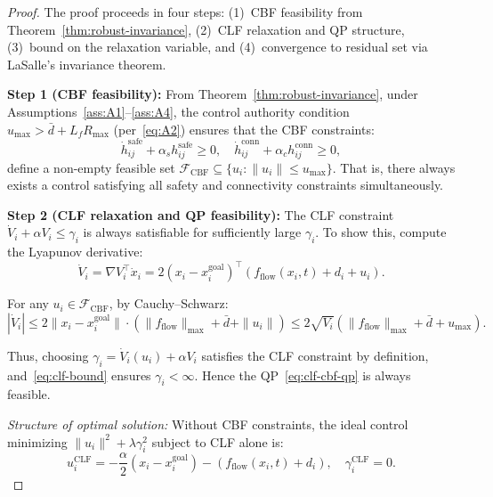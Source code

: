 \documentclass[conference]{IEEEconf}
\theoremstyle{plain}
\begin{document}
\begin{proof}
The proof proceeds in four steps: (1)~CBF feasibility from Theorem~\ref{thm:robust-invariance}, (2)~CLF relaxation and QP structure, (3)~bound on the relaxation variable, and (4)~convergence to residual set via LaSalle's invariance theorem.

\medskip
\noindent\textbf{Step 1 (CBF feasibility):}
From Theorem~\ref{thm:robust-invariance}, under Assumptions~\ref{ass:A1}--\ref{ass:A4}, the control authority condition $u_{\max}>\bar{d}+L_fR_{\max}$ (per~\eqref{eq:A2}) ensures that the CBF constraints:
\begin{equation}
\dot{h}_{ij}^{\mathrm{safe}} + \alpha_s h_{ij}^{\mathrm{safe}} \ge 0, \quad \dot{h}_{ij}^{\mathrm{conn}} + \alpha_c h_{ij}^{\mathrm{conn}} \ge 0,
\label{eq:cbf-constraints-t2}
\end{equation}
define a non-empty feasible set $\mathcal{F}_{\mathrm{CBF}}\subseteq\{u_i:\|u_i\|\le u_{\max}\}$. That is, there always exists a control satisfying all safety and connectivity constraints simultaneously.

\medskip
\noindent\textbf{Step 2 (CLF relaxation and QP feasibility):}
The CLF constraint $\dot{V}_i+\alpha V_i\le\gamma_i$ is always satisfiable for sufficiently large $\gamma_i$. To show this, compute the Lyapunov derivative:
\begin{equation}
\dot{V}_i = \nabla V_i^\top\dot{x}_i = 2(x_i-x_i^{\mathrm{goal}})^\top(f_{\mathrm{flow}}(x_i,t)+d_i+u_i).
\label{eq:clf-derivative}
\end{equation}

For any $u_i\in\mathcal{F}_{\mathrm{CBF}}$, by Cauchy--Schwarz:
\begin{equation}
|\dot{V}_i| \le 2\|x_i-x_i^{\mathrm{goal}}\|\cdot(\|f_{\mathrm{flow}}\|_{\max}+\bar{d}+\|u_i\|) \le 2\sqrt{V_i}(\|f_{\mathrm{flow}}\|_{\max}+\bar{d}+u_{\max}).
\label{eq:clf-bound}
\end{equation}

Thus, choosing $\gamma_i=\dot{V}_i(u_i)+\alpha V_i$ satisfies the CLF constraint by definition, and~\eqref{eq:clf-bound} ensures $\gamma_i<\infty$. Hence the QP~\eqref{eq:clf-cbf-qp} is always feasible.

\emph{Structure of optimal solution:}
Without CBF constraints, the ideal control minimizing $\|u_i\|^2+\lambda\gamma_i^2$ subject to CLF alone is:
\begin{equation}
u_i^{\mathrm{CLF}} = -\frac{\alpha}{2}(x_i-x_i^{\mathrm{goal}}) - (f_{\mathrm{flow}}(x_i,t)+d_i), \quad \gamma_i^{\mathrm{CLF}}=0.
\label{eq:ideal-clf}
\end{equation}


\end{proof}
\end{document}
